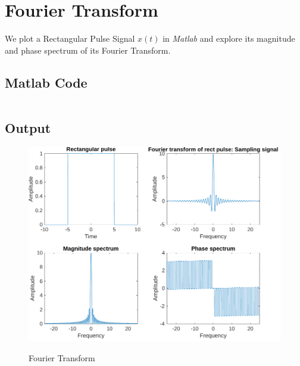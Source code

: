 \section{Fourier Transform}
\label{sec:fourier transform}

We plot a Rectangular Pulse Signal $x(t)$ in \textit{Matlab} and explore 
its magnitude and phase spectrum of its Fourier Transform.

\subsection{Matlab Code}

\inputminted[fontsize=\footnotesize,autogobble]{matlab}{code/fourier.m}

\subsection{Output}

\begin{figure}[!htb]
	\centering
	\includegraphics[width=6in]{res/figures/Figure_1.pdf}
	\label{output:fourier transform}
	\caption{Fourier Transform}
\end{figure}
